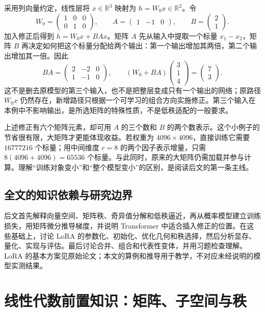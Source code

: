 \documentclass[UTF8,12pt,a4paper,fontset=fandol]{ctexart}
\begin{document}
采用列向量约定，线性层将 $x\in\mathbb R^3$ 映射为 $h=W_0x\in\mathbb R^2$。令
\[
W_0=\begin{pmatrix}1&0&0\\0&1&0\end{pmatrix},
\qquad
A=\begin{pmatrix}1&-1&0\end{pmatrix},
\qquad
B=\begin{pmatrix}2\\1\end{pmatrix}.
\]
加入修正后得到 $h=W_0x+BAx$。矩阵 $A$ 先从输入中提取一个标量 $x_1-x_2$，矩阵 $B$ 再决定如何把这个标量分配给两个输出：第一个输出增加其两倍，第二个输出增加其一倍。因此
\[
BA=\begin{pmatrix}2&-2&0\\1&-1&0\end{pmatrix},
\qquad
(W_0+BA)\begin{pmatrix}3\\1\\4\end{pmatrix}
=\begin{pmatrix}7\\3\end{pmatrix}.
\]
这不是删去原模型的第三个输入，也不是把整层变成只有一个输出的网络；原路径 $W_0x$ 仍然存在，新增路径只根据一个可学习的组合方向实施修正。第三个输入在本例中不影响输出，是所选矩阵的特殊性质，不是低秩适配的一般要求。

上述修正有六个矩阵元素，却可用 $A$ 的三个数和 $B$ 的两个数表示。这个小例子的节省很有限，大矩阵才更能体现收益。若权重为 $4096\times4096$，直接训练它需要 $16777216$ 个标量；用中间维度 $r=8$ 的两个因子表示增量，只需 $8(4096+4096)=65536$ 个标量。与此同时，原来的大矩阵仍需加载并参与计算。理解“训练对象变小”和“整个模型变小”的区别，是阅读后文的第一条主线。

\subsection{全文的知识依赖与研究边界}

后文首先解释向量空间、矩阵秩、奇异值分解和低秩逼近，再从概率模型建立训练损失，用矩阵微分推导梯度，并说明 Transformer 中适合插入修正的位置。在这些基础上，讨论 LoRA 的参数化、初始化、优化几何和秩选择，然后分析显存、量化、实现与评估。最后讨论合并、组合和代表性变体，并用习题检查理解。LoRA 的基本方案见原始论文\cite{hu2021}；本文的算例和推导用于教学，不对应未经说明的模型实测结果。

\section{线性代数前置知识：矩阵、子空间与秩}
\label{sec:linear-algebra}
\end{document}
